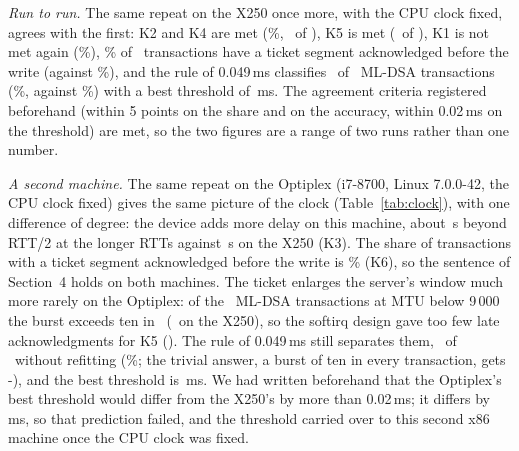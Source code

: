 \documentclass[9pt]{article}
\newcommand{\ms}{\,ms\xspace}
\begin{document}
\emph{Run to run.} The same repeat on the X250 once more, with the CPU clock fixed, agrees with the first: K2 and K4 are met (\RqKTwoPct\%, \RqKFourRight\ of \RqKFourN), K5 is met (\RqKFiveRight\ of \RqKFiveN), K1 is not met again (\RqKOnePct\%), \RqKSixPct\% of \RqKSixN\ transactions have a ticket segment acknowledged before the write (against \RpKSixPct\%), and the rule of 0.049\ms classifies \RqKSevenRight\ of \RqKSevenN\ ML-DSA transactions (\RqKSevenPct\%, against \RpKSevenPct\%) with a best threshold of \RqKSevenBestLo\ms. The agreement criteria registered beforehand (within 5 points on the share and on the accuracy, within 0.02\ms on the threshold) are met, so the two figures are a range of two runs rather than one number.

\emph{A second machine.} The same repeat on the Optiplex (i7-8700, Linux 7.0.0-42, the CPU clock fixed) gives the same picture of the clock (Table~\ref{tab:clock}), with one difference of degree: the device adds more delay on this machine, about \RoKThreeMed\,\textmu s beyond RTT/2 at the longer RTTs against \RpKThreeMed\,\textmu s on the X250 (K3). The share of transactions with a ticket segment acknowledged before the write is \RoKSixPct\% (K6), so the sentence of Section~4 holds on both machines. The ticket enlarges the server's window much more rarely on the Optiplex: of the \RoKSevenN\ ML-DSA transactions at MTU below 9\,000 the burst exceeds ten in \RoKSevenPos\ (\RpKSevenPos\ on the X250), so the softirq design gave too few late acknowledgments for K5 (\RoKFiveN). The rule of 0.049\ms still separates them, \RoKSevenRight\ of \RoKSevenN\ without refitting (\RoKSevenPct\%; the trivial answer, a burst of ten in every transaction, gets \the\numexpr\RoKSevenN-\RoKSevenPos\relax), and the best threshold is \RoKSevenBestLo\ms. We had written beforehand that the Optiplex's best threshold would differ from the X250's by more than 0.02\ms; it differs by \RoKSevenDiff\ms, so that prediction failed, and the threshold carried over to this second x86 machine once the CPU clock was fixed.
\end{document}

